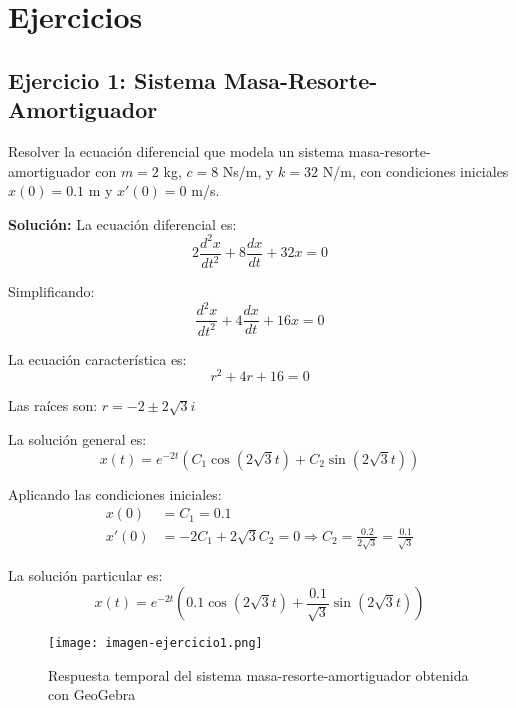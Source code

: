 \section{Ejercicios}

\subsection{Ejercicio 1: Sistema Masa-Resorte-Amortiguador}

Resolver la ecuación diferencial que modela un sistema masa-resorte-amortiguador con $m = 2$ kg, $c = 8$ Ns/m, y $k = 32$ N/m, con condiciones iniciales $x(0) = 0.1$ m y $x'(0) = 0$ m/s.

\textbf{Solución:}
La ecuación diferencial es:
\begin{equation}
    2 \frac{d^2 x}{dt^2} + 8 \frac{dx}{dt} + 32x = 0
\end{equation}

Simplificando:
\begin{equation}
    \frac{d^2 x}{dt^2} + 4 \frac{dx}{dt} + 16x = 0
\end{equation}

La ecuación característica es:
\begin{equation}
    r^2 + 4r + 16 = 0
\end{equation}

Las raíces son: $r = -2 \pm 2\sqrt{3}i$

La solución general es:
\begin{equation}
    x(t) = e^{-2t} (C_1 \cos(2\sqrt{3}t) + C_2 \sin(2\sqrt{3}t))
\end{equation}

Aplicando las condiciones iniciales:
\begin{align}
    x(0) &= C_1 = 0.1 \\
    x'(0) &= -2C_1 + 2\sqrt{3}C_2 = 0 \Rightarrow C_2 = \frac{0.2}{2\sqrt{3}} = \frac{0.1}{\sqrt{3}}
\end{align}

La solución particular es:
\begin{equation}
    x(t) = e^{-2t} \left(0.1 \cos(2\sqrt{3}t) + \frac{0.1}{\sqrt{3}} \sin(2\sqrt{3}t)\right)
\end{equation}

\begin{figure}[H]
    \centering
    \texttt{[image: imagen-ejercicio1.png]}
    \caption{Respuesta temporal del sistema masa-resorte-amortiguador obtenida con GeoGebra}
\end{figure}


